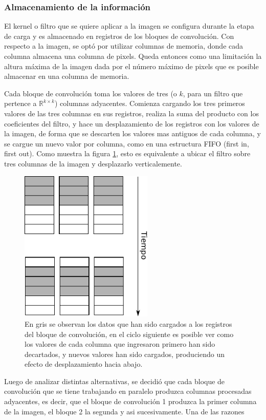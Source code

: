 \documentclass[conference,compsoc]{IEEEtran}
\begin{document}
\subsubsection{Almacenamiento de la informaci\'on}
El kernel o filtro que se quiere aplicar a la imagen se configura durante la
etapa de carga y es almacenado en registros de los bloques de convoluci\'on. Con
respecto a la imagen, se opt\'o por utilizar columnas de memoria, donde cada
columna almacena una columna de pixels. Queda entonces como una limitaci\'on la
altura m\'axima de la imagen dada por el n\'umero m\'aximo de pixels que es
posible almacenar en una columna de memoria.

Cada bloque de convoluci\'on toma los valores de tres (o $k$, para un filtro que
pertence a $\mathbb{R}^{k{\times}k}$) columnas adyacentes.
Comienza cargando los tres primeros valores de las tres columnas en sus registros,
realiza la suma del producto con los coeficientes del filtro, y hace un
desplazamiento de los registros con los valores de la imagen, de forma que se
descarten los valores mas antiguos de cada columna, y se cargue un nuevo valor
por columna, como en una estructura FIFO (first in, first out). Como muestra
la figura \ref{proc_conv}, esto es equivalente a ubicar el filtro sobre tres
columnas de la imagen y desplazarlo verticalemente.
\begin{figure}[!t]
\centering
\includegraphics[width=2.5in]{proc_conv.pdf}
\caption{En gris se observan los datos que han sido cargados a los registros del
bloque de convoluci\'on, en el ciclo siguiente es posible ver como los valores
de cada columna que ingresaron primero han sido decartados, y nuevos valores han
sido cargados, produciendo un efecto de desplazamiento hacia abajo.}
\label{proc_conv}
\end{figure}

Luego de analizar distintas alternativas, se decidi\'o que cada bloque de
convoluci\'on que se tiene trabajando en paralelo produzca columnas procesadas
adyacentes, es decir, que el bloque de convoluci\'on 1 produzca la primer
columna de la imagen, el bloque 2 la segunda y asi sucesivamente. Una de las
razones 
\end{document}
